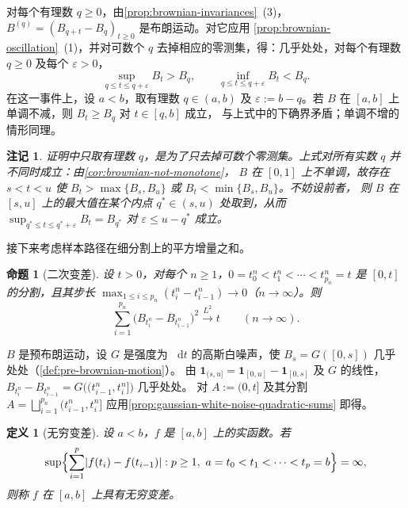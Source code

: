 \documentclass[UTF8,11pt,a4paper,oneside,fontset=fandol]{ctexrep}
\makeatletter
\numberwithin{equation}{section}
\theoremstyle{zhthm}
\newtheorem{proposition}[theorem]{命题}
\newtheorem{definition}[theorem]{定义}
\newtheorem{remark}[theorem]{注记}
\renewenvironment{proof}[1][\proofname]{\par
  \pushQED{\qed}%
  \normalfont\topsep6\p@\@plus6\p@\relax
  \trivlist
  \item[\hskip\labelsep\bfseries#1\hspace{0.5em}]\ignorespaces
}{%
  \popQED\endtrivlist\@endpefalse
}
\renewcommand{\proofname}{证明}
\newcommand{\ind}[1]{\mathbf{1}_{#1}}
\newcommand{\dd}{\mathop{}\!\mathrm{d}}
\DeclarePairedDelimiter{\abs}{\lvert}{\rvert}
\newcommand{\Lpto}[1]{\xrightarrow{L^{#1}}}
\makeatother
\begin{document}
\begin{proof}
对每个有理数 $q\ge0$，由\cref{prop:brownian-invariances}~(3)，$B^{(q)}=(B_{q+t}-B_q)_{t\ge0}$ 是布朗运动。对它应用%
\cref{prop:brownian-oscillation}~(1)，并对可数个 $q$ 去掉相应的零测集，得：几乎处处，对每个有理数 $q\ge0$ 及每个 $\varepsilon>0$，
\[
  \sup_{q\le t\le q+\varepsilon}B_t>B_q,\qquad\inf_{q\le t\le q+\varepsilon}B_t<B_q.
\]
在这一事件上，设 $a<b$，取有理数 $q\in(a,b)$ 及 $\varepsilon:=b-q$。若 $B$ 在 $[a,b]$ 上单调不减，则 $B_t\ge B_q$ 对 $t\in[q,b]$ 成立，
与上式中的下确界矛盾；单调不增的情形同理。
\end{proof}

\begin{remark}
\label{rem:not-monotone-rational}
证明中只取有理数 $q$，是为了只去掉可数个零测集。上式对所有实数 $q$ 并不同时成立：由\cref{cor:brownian-not-monotone}，
$B$ 在 $[0,1]$ 上不单调，故存在 $s<t<u$ 使 $B_t>\max\{B_s,B_u\}$ 或 $B_t<\min\{B_s,B_u\}$。不妨设前者，
则 $B$ 在 $[s,u]$ 上的最大值在某个内点 $q^*\in(s,u)$ 处取到，从而 $\sup_{q^*\le t\le q^*+\varepsilon}B_t=B_{q^*}$ 对 $\varepsilon\le u-q^*$ 成立。
\end{remark}

接下来考虑样本路径在细分割上的平方增量之和。

\begin{proposition}[二次变差]
\label{prop:brownian-quadratic-variation}
设 $t>0$，对每个 $n\ge1$，$0=t_0^n<t_1^n<\cdots<t_{p_n}^n=t$ 是 $[0,t]$ 的分割，且其步长
$\max_{1\le i\le p_n}(t_i^n-t_{i-1}^n)\to0$（$n\to\infty$）。则
\[
  \sum_{i=1}^{p_n}\bigl(B_{t_i^n}-B_{t_{i-1}^n}\bigr)^2\Lpto{2}t\qquad(n\to\infty).
\]
\end{proposition}

\begin{proof}
$B$ 是预布朗运动，设 $G$ 是强度为 $\dd t$ 的高斯白噪声，使 $B_s=G([0,s])$ 几乎处处（\cref{def:pre-brownian-motion}）。
由 $\ind{(s,u]}=\ind{[0,u]}-\ind{[0,s]}$ 及 $G$ 的线性，$B_{t_i^n}-B_{t_{i-1}^n}=G\bigl((t_{i-1}^n,t_i^n]\bigr)$ 几乎处处。
对 $A:=(0,t]$ 及其分割 $A=\bigsqcup_{i=1}^{p_n}(t_{i-1}^n,t_i^n]$ 应用\cref{prop:gaussian-white-noise-quadratic-sums} 即得。
\end{proof}

\begin{definition}[无穷变差]
\label{def:infinite-variation}
设 $a<b$，$f$ 是 $[a,b]$ 上的实函数。若
\[
  \sup\Bigl\{\sum_{i=1}^{p}\abs{f(t_i)-f(t_{i-1})}:p\ge1,\ a=t_0<t_1<\cdots<t_p=b\Bigr\}=\infty,
\]
则称 $f$ 在 $[a,b]$ 上具有无穷变差。
\end{definition}
\end{document}
